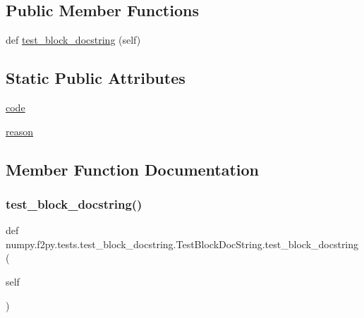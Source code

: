 \subsection*{Public Member Functions}
\begin{DoxyCompactItemize}
\item 
def \hyperlink{classnumpy_1_1f2py_1_1tests_1_1test__block__docstring_1_1TestBlockDocString_a63ec0656e6daf05e18a5486b0d446fbd}{test\+\_\+block\+\_\+docstring} (self)
\end{DoxyCompactItemize}
\subsection*{Static Public Attributes}
\begin{DoxyCompactItemize}
\item 
\hyperlink{classnumpy_1_1f2py_1_1tests_1_1test__block__docstring_1_1TestBlockDocString_ad59a95186718c10396d98899221296cc}{code}
\item 
\hyperlink{classnumpy_1_1f2py_1_1tests_1_1test__block__docstring_1_1TestBlockDocString_a0f86eb9abc58464de70d8def83a8f665}{reason}
\end{DoxyCompactItemize}


\subsection{Member Function Documentation}
\mbox{\label{classnumpy_1_1f2py_1_1tests_1_1test__block__docstring_1_1TestBlockDocString_a63ec0656e6daf05e18a5486b0d446fbd}} 
\subsubsection{\texorpdfstring{test\+\_\+block\+\_\+docstring()}{test\_block\_docstring()}}
{\footnotesize\ttfamily def numpy.\+f2py.\+tests.\+test\+\_\+block\+\_\+docstring.\+Test\+Block\+Doc\+String.\+test\+\_\+block\+\_\+docstring (\begin{DoxyParamCaption}\item[{}]{self }\end{DoxyParamCaption})}



